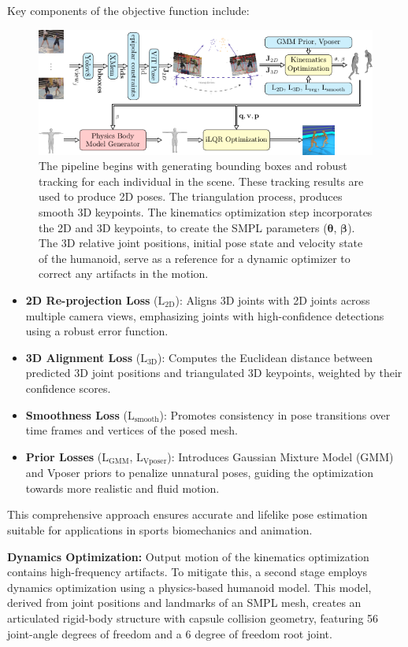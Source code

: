 \documentclass{egpubl}
\begin{document}
Key components of the objective function include:
\begin{figure}[htp]
\includegraphics[width=0.73\linewidth]{pipeline.pdf}
 \centering
  \caption{The pipeline begins with generating bounding boxes  and robust tracking  for each individual in the scene. These tracking results are used to produce 2D poses. The triangulation process, produces smooth 3D keypoints. The kinematics optimization step incorporates the 2D and 3D keypoints, to create the SMPL parameters ($\mathbf{\theta}$, $\mathbf{\beta}$). The 3D relative joint positions, initial pose state  and velocity state of the humanoid, serve as a reference for a dynamic optimizer to correct any artifacts in the motion.}
\end{figure}
\begin{itemize}
    \item \textbf{2D Re-projection Loss} ($\mathrm{L}_\text{2D}$): Aligns 3D joints with 2D joints across multiple camera views, emphasizing joints with high-confidence detections using a robust error function.
    \item \textbf{3D Alignment Loss} ($\mathrm{L}_\text{3D}$): Computes the Euclidean distance between predicted 3D joint positions and triangulated 3D keypoints, weighted by their confidence scores.
    \item \textbf{Smoothness Loss} ($\mathrm{L}_\text{smooth}$): Promotes consistency in pose transitions over time frames and vertices of the posed mesh.
    \item \textbf{Prior Losses} ($\mathrm{L}_{\text{GMM}}$, $\mathrm{L}_{\text{Vposer}}$): Introduces Gaussian Mixture Model (GMM) and Vposer priors to penalize unnatural poses, guiding the optimization towards more realistic and fluid motion.
\end{itemize}
 This comprehensive approach ensures accurate and lifelike pose estimation suitable for applications in sports biomechanics and animation.


\textbf{Dynamics Optimization:} Output motion of the kinematics optimization contains high-frequency artifacts. To mitigate this, a second stage employs dynamics optimization using a physics-based humanoid model. This model, derived from joint positions and landmarks of an SMPL mesh, creates an articulated rigid-body structure with capsule collision geometry, featuring 56 joint-angle degrees of freedom and a 6 degree of freedom root joint.
\end{document}
